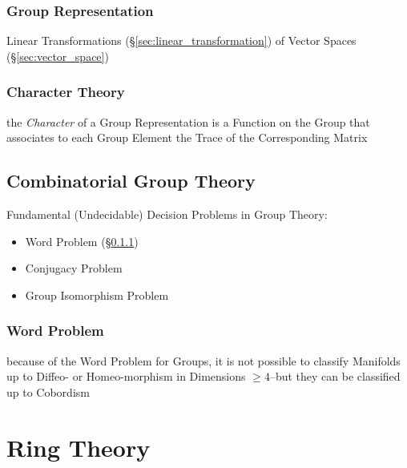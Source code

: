 \subsubsection{Group Representation}\label{sec:group_representation}

Linear Transformations (\S\ref{sec:linear_transformation}) of Vector Spaces
(\S\ref{sec:vector_space})



\subsubsection{Character Theory}\label{sec:character_theory}

the \emph{Character} of a Group Representation is a Function on the Group that
associates to each Group Element the Trace of the Corresponding Matrix



\subsection{Combinatorial Group Theory}\label{sec:combinatorial_group_theory}

Fundamental (Undecidable) Decision Problems in Group Theory:
\begin{itemize}
  \item Word Problem (\S\ref{sec:word_problem})
  \item Conjugacy Problem
  \item Group Isomorphism Problem
\end{itemize}



\subsubsection{Word Problem}\label{sec:word_problem}

because of the Word Problem for Groups, it is not possible to classify
Manifolds up to Diffeo- or Homeo-morphism in Dimensions $\geq 4$--but they can
be classified up to Cobordism




\section{Ring Theory}\label{sec:ring_theory}

